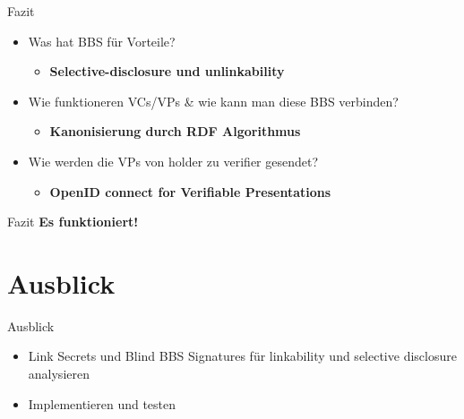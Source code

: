 \documentclass[
	ngerman,%
	authorontitle=true,
	]{bfhbeamer}
\begin{document}
\begin{frame}{Fazit}
    \begin{itemize}
        \item Was hat BBS für Vorteile?
        \begin{itemize}
            \item \textbf{Selective-disclosure und unlinkability}
        \end{itemize}
        \item Wie funktioneren VCs/VPs \& wie kann man diese BBS verbinden?
        \begin{itemize}
            \item \textbf{Kanonisierung durch RDF Algorithmus}
        \end{itemize}
        \item Wie werden die VPs von holder zu verifier gesendet?
        \begin{itemize}
            \item \textbf{OpenID connect for Verifiable Presentations}
        \end{itemize}
    \end{itemize}
\end{frame}

\begin{frame}{Fazit}
    \centering
    \textbf{\huge Es funktioniert!}
\end{frame}

\section{Ausblick}

\begin{frame}{Ausblick}
    \begin{itemize}
        \item Link Secrets und Blind BBS Signatures für linkability und selective disclosure analysieren
        \item Implementieren und testen
    \end{itemize}
\end{frame}
\end{document}
